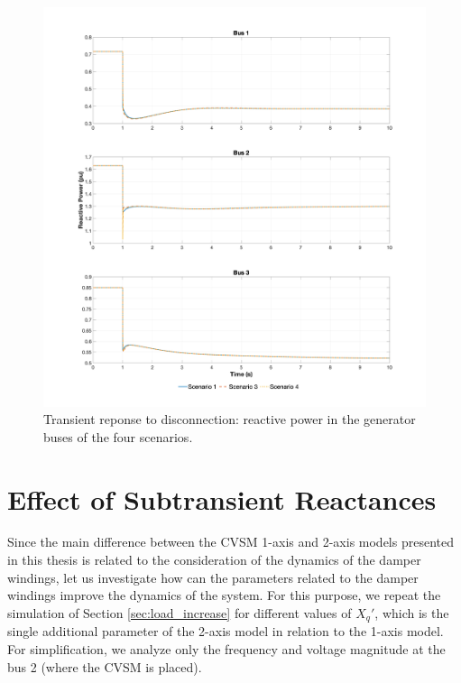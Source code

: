 \newpage
\begin{figure}[ht!]
    \centering
    \includegraphics[width = \linewidth]{images/reactive_disconnection.png}
    \caption{Transient reponse to disconnection: reactive power in the generator buses of the four scenarios.}
    \label{fig:reactive_disconnection}
\end{figure}

\section{Effect of Subtransient Reactances}
Since the main difference between the CVSM 1-axis and 2-axis models presented in
this thesis is related to the consideration of the dynamics of the damper
windings, let us investigate how can the parameters related to the damper
windings improve the dynamics of the system. For this purpose, we repeat the
simulation of Section \ref{sec:load_increase} for different values of $X_q'$,
which is the single additional parameter of the 2-axis model in relation to the
1-axis model. For simplification, we analyze only the frequency and voltage
magnitude at the bus 2 (where the CVSM is placed).

